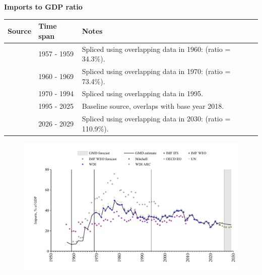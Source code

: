 \documentclass[12pt,a4paper,landscape]{article}
\begin{document}
\begin{adjustbox}{max totalsize={\paperwidth}{\paperheight},center}
\begin{minipage}[t][\textheight][t]{\textwidth}
\vspace*{0.5cm}
{}
\begin{center}
{\Large\bfseries Imports to GDP ratio}
\end{center}
\vspace{0.5cm}
\begin{table}[H]
\centering
\small
\begin{tabular}{|l|l|l|}
\hline
\textbf{Source} & \textbf{Time span} & \textbf{Notes} \\
\hline
\rowcolor{white}\cite{Mitchell}& 1957 - 1959 &Spliced using overlapping data in 1960: (ratio = 34.3\%). \\
\rowcolor{lightgray}\cite{WDI_ARC}& 1960 - 1969 &Spliced using overlapping data in 1970: (ratio = 73.4\%). \\
\rowcolor{white}\cite{WDI}& 1970 - 1994 &Spliced using overlapping data in 1995. \\
\rowcolor{lightgray}\cite{OECD_EO}& 1995 - 2025 &Baseline source, overlaps with base year 2018. \\
\rowcolor{white}\cite{IMF_WEO_forecast}& 2026 - 2029 &Spliced using overlapping data in 2030: (ratio = 110.9\%). \\
\hline
\end{tabular}
\end{table}
\begin{figure}[H]
\centering
\includegraphics[width=\textwidth,height=0.6\textheight,keepaspectratio]{graphs/ISR_imports_GDP.pdf}
\end{figure}
\end{minipage}
\end{adjustbox}
\end{document}
